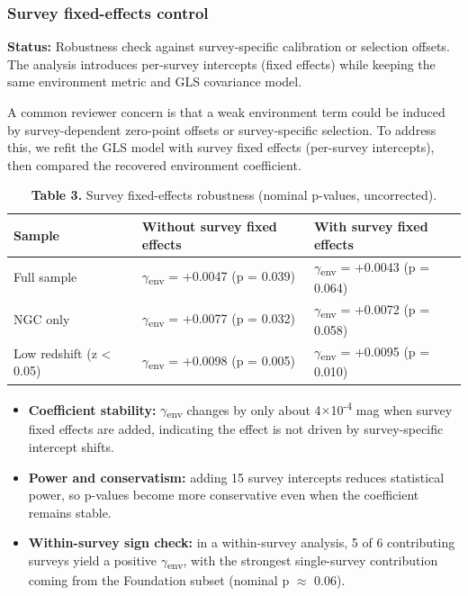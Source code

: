 \documentclass[11pt,a4paper]{article}
\begin{document}
\subsubsection{Survey fixed-effects control}
\begin{mdframed}[linecolor=accent,linewidth=0.5pt,backgroundcolor=callout-bg,leftline=true,rightline=true,topline=true,bottomline=true,innerleftmargin=8pt,innerrightmargin=8pt,innertopmargin=6pt,innerbottommargin=6pt]
\textbf{Status:} Robustness check against survey-specific calibration or selection offsets.
The analysis introduces per-survey intercepts (fixed effects) while keeping the same environment metric and GLS covariance model.
\end{mdframed}

A common reviewer concern is that a weak environment term could be induced by survey-dependent zero-point offsets or survey-specific selection.
To address this, we refit the GLS model with survey fixed effects (per-survey intercepts), then compared the recovered environment coefficient.

\begin{table}[H]
\centering
\footnotesize
\caption{\textbf{Table 3.} Survey fixed-effects robustness (nominal p-values, uncorrected).}
\begin{tabularx}{\linewidth}{l>{\RaggedRight\arraybackslash}X>{\RaggedRight\arraybackslash}X}
\toprule
\textbf{Sample} & \textbf{Without survey fixed effects} & \textbf{With survey fixed effects} \tabularnewline
\midrule
Full sample & $\gamma$\textsubscript{env} = +0.0047 (p = 0.039) & $\gamma$\textsubscript{env} = +0.0043 (p = 0.064) \tabularnewline
NGC only & $\gamma$\textsubscript{env} = +0.0077 (p = 0.032) & $\gamma$\textsubscript{env} = +0.0072 (p = 0.058) \tabularnewline
Low redshift (z < 0.05) & $\gamma$\textsubscript{env} = +0.0098 (p = 0.005) & $\gamma$\textsubscript{env} = +0.0095 (p = 0.010) \tabularnewline
\bottomrule
\end{tabularx}
\end{table}

\begin{itemize}
  \item \textbf{Coefficient stability:} $\gamma$\textsubscript{env} changes by only about 4$\times$10\textsuperscript{-4} mag when survey fixed effects are added, indicating the effect is not driven by survey-specific intercept shifts.
  \item \textbf{Power and conservatism:} adding 15 survey intercepts reduces statistical power, so p-values become more conservative even when the coefficient remains stable.
  \item \textbf{Within-survey sign check:} in a within-survey analysis, 5 of 6 contributing surveys yield a positive $\gamma$\textsubscript{env}, with the strongest single-survey contribution coming from the Foundation subset (nominal p $\approx$ 0.06).
\end{itemize}
\end{document}
